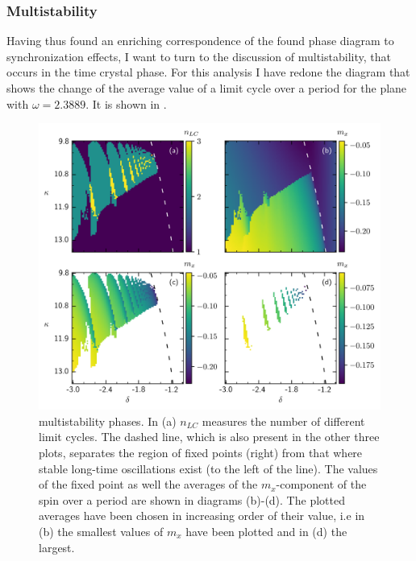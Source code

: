 \subsubsection{Multistability}\label{sec:multistability}
Having thus found an enriching correspondence of the found phase diagram to synchronization effects, I want to turn to the discussion of multistability, that occurs in the time crystal phase. For this analysis I have redone the diagram that shows the change of the average value of a limit cycle over a period for the plane with $\omega=2.3889$. It is shown in .
\begin{figure}[H]
    \vspace*{-0.45cm}
    \hspace*{-1.2cm}
    \includegraphics{pictures/limit_cycle_mean.png}
    \caption{multistability phases. In (a) $n_{LC}$ measures the number of different limit cycles. The dashed line, which is also present in the other three plots, separates the region of fixed points (right) from that where stable long-time oscillations exist (to the left of the line). The values of the fixed point as well the averages of the $m_x$-component of the spin over a period are shown in diagrams (b)-(d). The plotted averages have been chosen in increasing order of their value, i.e in (b) the smallest values of $m_x$ have been plotted and in (d) the largest.}
    \label{fig:precise_multistab2d}
\end{figure}
